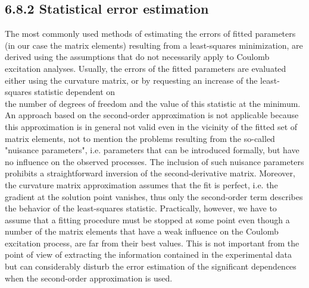 \documentclass[10pt]{article}
\begin{document}
\subsection*{6.8.2 Statistical error estimation}
The most commonly used methods of estimating the errors of fitted parameters (in our case the matrix elements) resulting from a least-squares minimization, are derived using the assumptions that do not necessarily apply to Coulomb excitation analyses. Usually, the errors of the fitted parameters are evaluated either using the curvature matrix, or by requesting an increase of the least-squares statistic dependent on\\
the number of degrees of freedom and the value of this statistic at the minimum. An approach based on the second-order approximation is not applicable because this approximation is in general not valid even in the vicinity of the fitted set of matrix elements, not to mention the problems resulting from the so-called "nuisance parameters", i.e. parameters that can be introduced formally, but have no influence on the observed processes. The inclusion of such nuisance parameters prohibits a straightforward inversion of the second-derivative matrix. Moreover, the curvature matrix approximation assumes that the fit is perfect, i.e. the gradient at the solution point vanishes, thus only the second-order term describes the behavior of the least-squares statistic. Practically, however, we have to assume that a fitting procedure must be stopped at some point even though a number of the matrix elements that have a weak influence on the Coulomb excitation process, are far from their best values. This is not important from the point of view of extracting the information contained in the experimental data but can considerably disturb the error estimation of the significant dependences when the second-order approximation is used.
\end{document}
